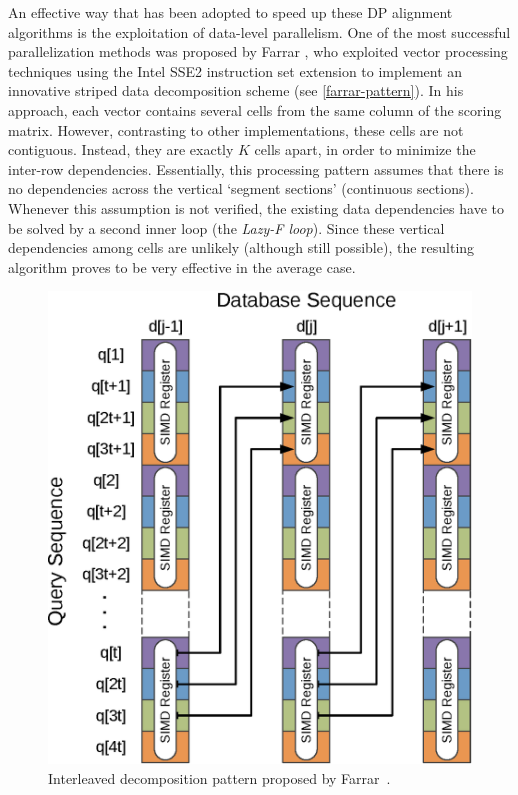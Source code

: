 \documentclass{bmcart}
\begin{document}
An effective way that has been adopted to speed up these \ac{DP} alignment algorithms is the exploitation of data-level parallelism. One of the most successful parallelization methods was proposed by Farrar \cite{farrar}, who exploited vector processing techniques using the Intel SSE2 instruction set extension to implement an innovative striped data decomposition scheme (see \autoref{farrar-pattern}). In his approach, each vector contains several cells from the same column of the scoring matrix. However, contrasting to other implementations, these cells are not contiguous. Instead, they are exactly $K$ cells apart, in order to minimize the inter-row dependencies. Essentially, this processing pattern assumes that there is no dependencies across the vertical `segment sections' (continuous sections). Whenever this assumption is not verified, the existing data dependencies have to be solved by a second inner loop (the \emph{Lazy-F loop}). Since these vertical dependencies among cells are unlikely (although still possible), the resulting algorithm proves to be very effective in the average case.

\begin{figure}[h!]
  \centering
  \includegraphics{img/farrar-pattern.eps}  
  \caption{Interleaved decomposition pattern proposed by Farrar~\cite{farrar}.}
  \label{farrar-pattern}
\end{figure}
\end{document}
